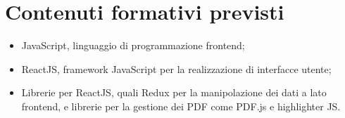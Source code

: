 \section*{Contenuti formativi previsti}
\begin{itemize}
    \item JavaScript, linguaggio di programmazione frontend;
    \item ReactJS, framework JavaScript per la realizzazione di interfacce utente;
    \item Librerie per ReactJS, quali Redux per la manipolazione dei dati a lato frontend, e librerie per la
    gestione dei PDF come PDF.js e highlighter JS.
\end{itemize}

\newpage
